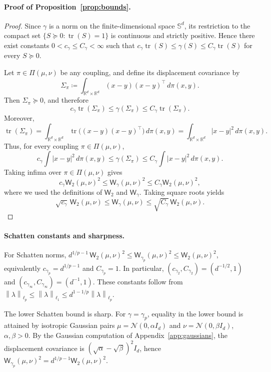 \documentclass{article}
\newcommand{\R}{\mathbb{R}}
\newcommand{\Wtwo}{\mathsf{W}_2}
\newcommand{\Wg}{\mathsf{W}_{\gamma}}
\newcommand{\tr}{\operatorname{tr}}
\newcommand{\norm}[1]{\left\lVert #1 \right\rVert}
\begin{document}
\paragraph{Proof of Proposition~\ref{prop:bounds}.}
\begin{proof}
Since $\gamma$ is a norm on the finite-dimensional space $\mathbb S^d$, its
restriction to the compact set $\{S\succeq 0:\tr(S)=1\}$ is continuous and
strictly positive. Hence there exist constants
$0<c_\gamma\le C_\gamma<\infty$ such that
$c_\gamma\tr(S)\le \gamma(S)\le C_\gamma\tr(S)$ for every $S\succeq0$.

Let $\pi\in\Pi(\mu,\nu)$ be any coupling, and define its displacement
covariance by
\[
    \Sigma_\pi
    \coloneqq
    \int_{\R^d\times\R^d} (x-y)(x-y)^\top\,d\pi(x,y).
\]
Then $\Sigma_\pi\succeq0$, and therefore
\[
    c_\gamma\tr(\Sigma_\pi)
    \le
    \gamma(\Sigma_\pi)
    \le
    C_\gamma\tr(\Sigma_\pi).
\]
Moreover,
\[
    \tr(\Sigma_\pi)
    =
    \int_{\R^d\times\R^d} \tr\bigl((x-y)(x-y)^\top\bigr)\,d\pi(x,y)
    =
    \int_{\R^d\times\R^d} |x-y|^2\,d\pi(x,y).
\]
Thus, for every coupling $\pi\in\Pi(\mu,\nu)$,
\[
    c_\gamma
    \int |x-y|^2\,d\pi(x,y)
    \le
    \gamma(\Sigma_\pi)
    \le
    C_\gamma
    \int |x-y|^2\,d\pi(x,y).
\]
Taking infima over $\pi\in\Pi(\mu,\nu)$ gives
\[
    c_\gamma \Wtwo(\mu,\nu)^2
    \le
    \Wg(\mu,\nu)^2
    \le
    C_\gamma \Wtwo(\mu,\nu)^2,
\]
where we used the definitions of $\Wtwo$ and $\Wg$. Taking square roots
yields
\[
    \sqrt{c_\gamma}\,\Wtwo(\mu,\nu)
    \le
    \Wg(\mu,\nu)
    \le
    \sqrt{C_\gamma}\,\Wtwo(\mu,\nu).
\]
\end{proof}

\paragraph{Schatten constants and sharpness.}

For Schatten norms, $d^{1/p-1}\,\Wtwo(\mu,\nu)^2\le \mathsf W_{\gamma_p}(\mu,\nu)^2\le \Wtwo(\mu,\nu)^2$, equivalently $c_{\gamma_p}=d^{1/p-1}$ and $C_{\gamma_p}=1$. In particular, $(c_{\gamma_2},C_{\gamma_2})=(d^{-1/2},1)$ and $(c_{\gamma_\infty},C_{\gamma_\infty})=(d^{-1},1)$. These constants follow from $\norm{\lambda}_{\ell_p}\le \norm{\lambda}_{\ell_1}\le d^{1-1/p}\norm{\lambda}_{\ell_p}$.

The lower Schatten bound is sharp. For $\gamma=\gamma_p$, equality in the lower bound is attained by isotropic Gaussian pairs $\mu=\mathcal N(0,\alpha I_d)$ and $\nu=\mathcal N(0,\beta I_d)$, $\alpha,\beta>0$. By the Gaussian computation of Appendix~\ref{app:gaussians}, the displacement covariance is $(\sqrt\alpha-\sqrt\beta)^2I_d$, hence $\mathsf W_{\gamma_p}(\mu,\nu)^2=d^{1/p-1}\Wtwo(\mu,\nu)^2$.
\end{document}
